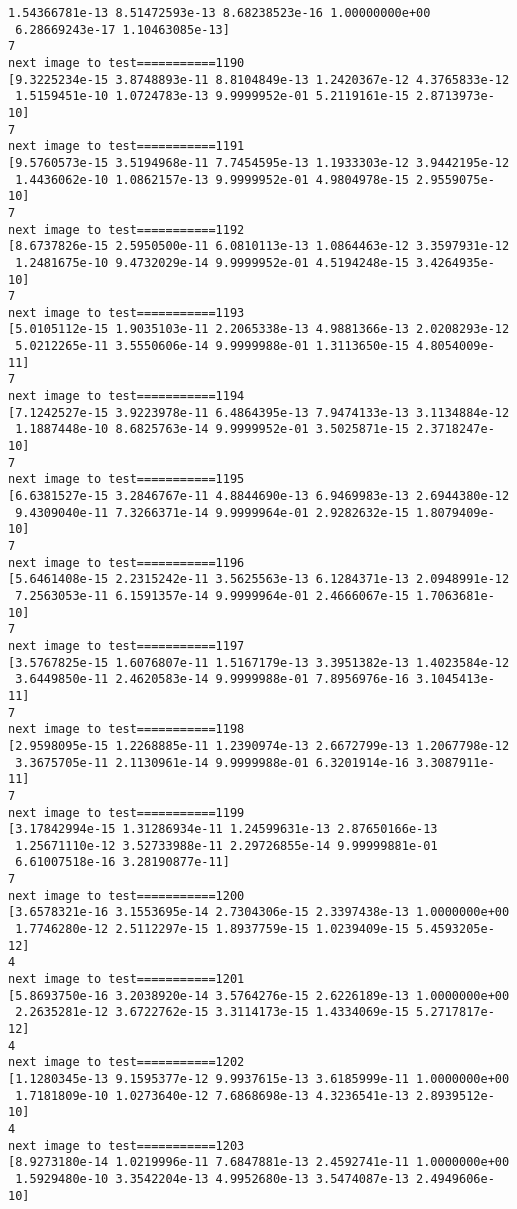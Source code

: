 \documentclass[11pt]{article}
\begin{document}
\begin{Verbatim}[commandchars=\\\{\}]
 1.54366781e-13 8.51472593e-13 8.68238523e-16 1.00000000e+00
 6.28669243e-17 1.10463085e-13]
7
next image to test===========1190
[9.3225234e-15 3.8748893e-11 8.8104849e-13 1.2420367e-12 4.3765833e-12
 1.5159451e-10 1.0724783e-13 9.9999952e-01 5.2119161e-15 2.8713973e-10]
7
next image to test===========1191
[9.5760573e-15 3.5194968e-11 7.7454595e-13 1.1933303e-12 3.9442195e-12
 1.4436062e-10 1.0862157e-13 9.9999952e-01 4.9804978e-15 2.9559075e-10]
7
next image to test===========1192
[8.6737826e-15 2.5950500e-11 6.0810113e-13 1.0864463e-12 3.3597931e-12
 1.2481675e-10 9.4732029e-14 9.9999952e-01 4.5194248e-15 3.4264935e-10]
7
next image to test===========1193
[5.0105112e-15 1.9035103e-11 2.2065338e-13 4.9881366e-13 2.0208293e-12
 5.0212265e-11 3.5550606e-14 9.9999988e-01 1.3113650e-15 4.8054009e-11]
7
next image to test===========1194
[7.1242527e-15 3.9223978e-11 6.4864395e-13 7.9474133e-13 3.1134884e-12
 1.1887448e-10 8.6825763e-14 9.9999952e-01 3.5025871e-15 2.3718247e-10]
7
next image to test===========1195
[6.6381527e-15 3.2846767e-11 4.8844690e-13 6.9469983e-13 2.6944380e-12
 9.4309040e-11 7.3266371e-14 9.9999964e-01 2.9282632e-15 1.8079409e-10]
7
next image to test===========1196
[5.6461408e-15 2.2315242e-11 3.5625563e-13 6.1284371e-13 2.0948991e-12
 7.2563053e-11 6.1591357e-14 9.9999964e-01 2.4666067e-15 1.7063681e-10]
7
next image to test===========1197
[3.5767825e-15 1.6076807e-11 1.5167179e-13 3.3951382e-13 1.4023584e-12
 3.6449850e-11 2.4620583e-14 9.9999988e-01 7.8956976e-16 3.1045413e-11]
7
next image to test===========1198
[2.9598095e-15 1.2268885e-11 1.2390974e-13 2.6672799e-13 1.2067798e-12
 3.3675705e-11 2.1130961e-14 9.9999988e-01 6.3201914e-16 3.3087911e-11]
7
next image to test===========1199
[3.17842994e-15 1.31286934e-11 1.24599631e-13 2.87650166e-13
 1.25671110e-12 3.52733988e-11 2.29726855e-14 9.99999881e-01
 6.61007518e-16 3.28190877e-11]
7
next image to test===========1200
[3.6578321e-16 3.1553695e-14 2.7304306e-15 2.3397438e-13 1.0000000e+00
 1.7746280e-12 2.5112297e-15 1.8937759e-15 1.0239409e-15 5.4593205e-12]
4
next image to test===========1201
[5.8693750e-16 3.2038920e-14 3.5764276e-15 2.6226189e-13 1.0000000e+00
 2.2635281e-12 3.6722762e-15 3.3114173e-15 1.4334069e-15 5.2717817e-12]
4
next image to test===========1202
[1.1280345e-13 9.1595377e-12 9.9937615e-13 3.6185999e-11 1.0000000e+00
 1.7181809e-10 1.0273640e-12 7.6868698e-13 4.3236541e-13 2.8939512e-10]
4
next image to test===========1203
[8.9273180e-14 1.0219996e-11 7.6847881e-13 2.4592741e-11 1.0000000e+00
 1.5929480e-10 3.3542204e-13 4.9952680e-13 3.5474087e-13 2.4949606e-10]

\end{Verbatim}
\end{document}
